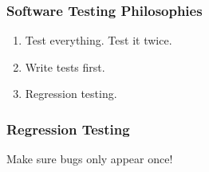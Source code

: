 \begin{frame}[fragile]
\frametitle{Software Testing Philosophies}

\begin{enumerate}
\item Test everything. Test it twice.
\item Write tests first.
\item Regression testing.
\end{enumerate}
\end{frame}

\begin{frame}[fragile]
\frametitle{Regression Testing}

Make sure bugs only appear once!

\end{frame}



